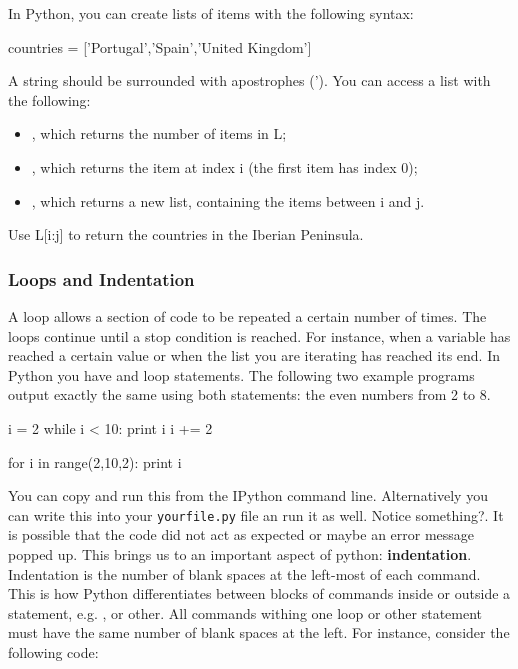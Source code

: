In Python, you can create lists of items with the following syntax:

\begin{python}
countries = ['Portugal','Spain','United Kingdom']
\end{python}

A string should be surrounded with apostrophes ('). You can access a list with
the following:

\begin{itemize}
 \item {}, which returns the number of items in L;
 \item {}, which returns the item at index i (the first item has index 0);
 \item {}, which returns a new list, containing the items between i and j. 
\end{itemize}

\begin{exercise}
 Use L[i:j] to return the countries in the Iberian Peninsula.
\end{exercise}

\subsubsection{Loops and Indentation}

A loop allows a section of code to be repeated a certain number of times. The loops continue until a stop condition is reached. For instance, when a variable has reached a certain value or when the list you are iterating has reached its end. In Python you have  and  loop statements. The following two example programs output exactly the same using both statements: the even numbers from 2 to
8.

\begin{python}
i = 2
while i < 10:
  print i  
  i += 2 
\end{python}

\begin{python}
for i in range(2,10,2):
    print i
\end{python}

You can copy and run this from the IPython command line. Alternatively you can write this into your \texttt{yourfile.py} file an run it as well. Notice something?. It is possible that the code did not act as expected or maybe an error message popped up. This brings us to an important aspect of python: \textbf{indentation}. Indentation is the number of blank spaces at the left-most of each command. This is how Python differentiates between blocks of commands inside or outside a statement, e.g. ,  or other. All commands withing one loop or other statement must have the same number of blank spaces at the left. For instance, consider the following code: 

